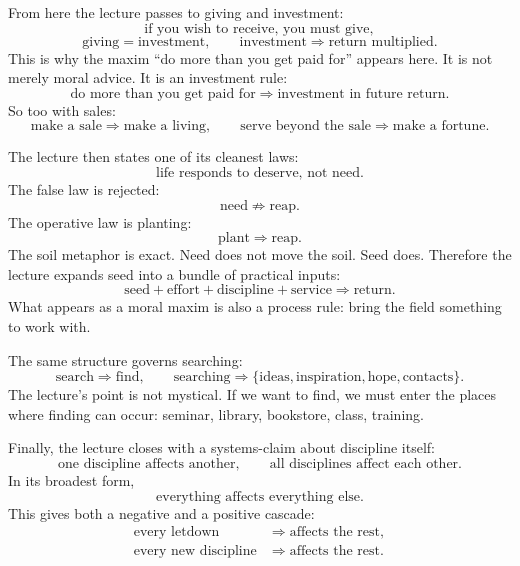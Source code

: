 From here the lecture passes to giving and investment:
\begin{equation}
\text{if you wish to receive, you must give},
\end{equation}
\begin{equation}
\text{giving}=\text{investment},
\qquad
\text{investment}\Rightarrow \text{return multiplied}.
\end{equation}
This is why the maxim ``do more than you get paid for'' appears here. It is not merely moral advice. It is an investment rule:
\begin{equation}
\text{do more than you get paid for} \Rightarrow \text{investment in future return}.
\end{equation}
So too with sales:
\begin{equation}
\text{make a sale} \Rightarrow \text{make a living},
\qquad
\text{serve beyond the sale} \Rightarrow \text{make a fortune}.
\end{equation}

The lecture then states one of its cleanest laws:
\begin{equation}
\text{life responds to deserve, not need}.
\end{equation}
The false law is rejected:
\begin{equation}
\text{need} \not\Rightarrow \text{reap}.
\end{equation}
The operative law is planting:
\begin{equation}
\text{plant} \Rightarrow \text{reap}.
\end{equation}
The soil metaphor is exact. Need does not move the soil. Seed does. Therefore the lecture expands seed into a bundle of practical inputs:
\begin{equation}
\text{seed}+\text{effort}+\text{discipline}+\text{service}\Rightarrow \text{return}.
\end{equation}
What appears as a moral maxim is also a process rule: bring the field something to work with.

The same structure governs searching:
\begin{equation}
\text{search} \Rightarrow \text{find},
\qquad
\text{searching} \Rightarrow \{\text{ideas},\text{inspiration},\text{hope},\text{contacts}\}.
\end{equation}
The lecture's point is not mystical. If we want to find, we must enter the places where finding can occur: seminar, library, bookstore, class, training.

Finally, the lecture closes with a systems-claim about discipline itself:
\begin{equation}
\text{one discipline affects another},
\qquad
\text{all disciplines affect each other}.
\end{equation}
In its broadest form,
\begin{equation}
\text{everything affects everything else}.
\end{equation}
This gives both a negative and a positive cascade:
\begin{align}
\text{every letdown} &\Rightarrow \text{affects the rest},\\
\text{every new discipline} &\Rightarrow \text{affects the rest}.
\end{align}

